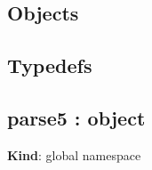 \subsection*{Objects}


\begin{DoxyDescription}
\item[\href{#parse5}{\tt parse5} \+: {\ttfamily object} ]
\end{DoxyDescription}\subsection*{Typedefs}


\begin{DoxyDescription}
\item[\href{#ElementLocationInfo}{\tt Element\+Location\+Info} \+: {\ttfamily Object} ]
\item[\href{#LocationInfo}{\tt Location\+Info} \+: {\ttfamily Object} ]
\item[\href{#ParserOptions}{\tt Parser\+Options} \+: {\ttfamily Object} ]
\item[\href{#SAXParserOptions}{\tt S\+A\+X\+Parser\+Options} \+: {\ttfamily Object} ]
\item[\href{#SerializerOptions}{\tt Serializer\+Options} \+: {\ttfamily Object} ]
\item[\href{#TreeAdapter}{\tt Tree\+Adapter} \+: {\ttfamily Object} ]
\end{DoxyDescription}\label{_parse5}%
 \subsection*{parse5 \+: {\ttfamily object}}

{\bfseries Kind}\+: global namespace


